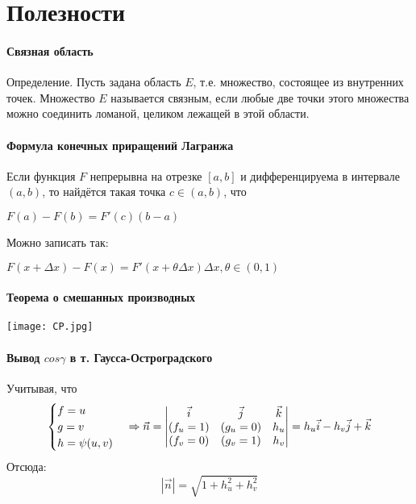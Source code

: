 \documentclass[12pt]{article}
\begin{document}
	
	
	
	
	
	
	
	
	
	
	
	
	
	
	
	
	
	
	
	
	
	
	
	
\newpage
\part{Полезности}
\subsection{Связная область}\label{eq4}
Определение. Пусть задана область $E$, т.е. множество, состоящее из внутренних точек. Множество $E$ называется связным, если любые две точки этого
множества можно соединить ломаной, целиком лежащей в этой области.

\subsection{Формула конечных приращений Лагранжа}\label{eq5}	
Если функция $F$ непрерывна на отрезке $[a,b]$  и дифференцируема в интервале $(a,b)$, то найдётся такая точка $ c\in (a,b)$, что
 
	$F(a) - F(b) = F'(c)(b - a)$
	
	Можно записать так:
	
	$F(x + \Delta x) - F(x) = F'(x + \theta\Delta x)\Delta x , \theta \in (0,1) $

\subsection{Теорема о смешанных производных}\label{eq6}
\texttt{[image: CP.jpg]}	

\subsection{Вывод $cos\gamma$ в т. Гаусса-Остроградского}\label{eq10}
Учитывая, что 
$$
\begin{cases}
   f = u \\
   g = v \\
   h = \psi(u,v)
\end{cases}
\Rightarrow
\vec{n} = 
\begin{vmatrix}
\vec{i} & \vec{j} & \vec{k} \\
(f_u = 1) & (g_u = 0) & h_u \\
(f_v = 0) & (g_v = 1) & h_v 
\end{vmatrix}
=
\-h_u \vec{i} - h_v \vec{j} + \vec{k}
$$
Отсюда:
$$
|\vec{n}| = \sqrt{1+h_u^2 + h_v^2}
$$
\end{document}
